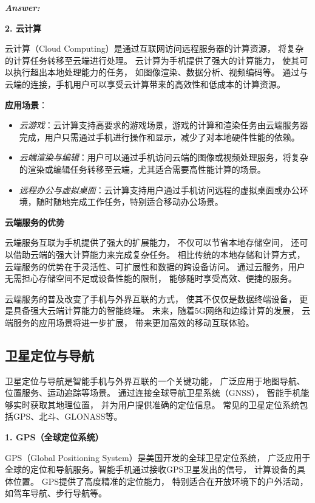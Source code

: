 \documentclass[12pt]{article}
\newenvironment{Answer}{
  \vspace{12pt}
  {\large\textbf{\textit{\hspace{-12pt}Answer:}}}\par
  \vspace{8pt}
} {\vspace{24pt}}
\begin{document}
\begin{Answer}
\noindent\textbf{2. 云计算}\noindent

云计算（Cloud Computing）是通过互联网访问远程服务器的计算资源，
将复杂的计算任务转移至云端进行处理。
云计算为手机提供了强大的计算能力，
使其可以执行超出本地处理能力的任务，
如图像渲染、数据分析、视频编码等。
通过与云端的连接，手机用户可以享受云计算带来的高效性和低成本的计算资源。

\textbf{应用场景}：
\begin{itemize}
    \item \textit{云游戏}：云计算支持高要求的游戏场景，游戏的计算和渲染任务由云端服务器完成，用户只需通过手机进行操作和显示，减少了对本地硬件性能的依赖。
    \item \textit{云端渲染与编辑}：用户可以通过手机访问云端的图像或视频处理服务，将复杂的渲染或编辑任务转移至云端，尤其适合需要高性能计算的场景。
    \item \textit{远程办公与虚拟桌面}：云计算支持用户通过手机访问远程的虚拟桌面或办公环境，随时随地完成工作任务，特别适合移动办公场景。
\end{itemize}

\noindent\textbf{云端服务的优势}\noindent

云端服务互联为手机提供了强大的扩展能力，
不仅可以节省本地存储空间，
还可以借助云端的强大计算能力来完成复杂任务。
相比传统的本地存储和计算方式，
云端服务的优势在于灵活性、可扩展性和数据的跨设备访问。
通过云服务，用户无需担心存储空间不足或设备性能的限制，
能够随时享受高效、便捷的服务。

云端服务的普及改变了手机与外界互联的方式，
使其不仅仅是数据终端设备，
更是具备强大云端计算能力的智能终端。
未来，随着5G网络和边缘计算的发展，
云端服务的应用场景将进一步扩展，
带来更加高效的移动互联体验。

\subsection*{卫星定位与导航}\noindent

卫星定位与导航是智能手机与外界互联的一个关键功能，
广泛应用于地图导航、位置服务、运动追踪等场景。
通过连接全球导航卫星系统（GNSS），
智能手机能够实时获取其地理位置，
并为用户提供准确的定位信息。
常见的卫星定位系统包括GPS、北斗、GLONASS等。

\noindent\textbf{1. GPS（全球定位系统）}\noindent

GPS（Global Positioning System）是美国开发的全球卫星定位系统，
广泛应用于全球的定位和导航服务。智能手机通过接收GPS卫星发出的信号，
计算设备的具体位置。
GPS提供了高度精准的定位能力，
特别适合在开放环境下的户外活动，
如驾车导航、步行导航等。


\end{Answer}
\end{document}
